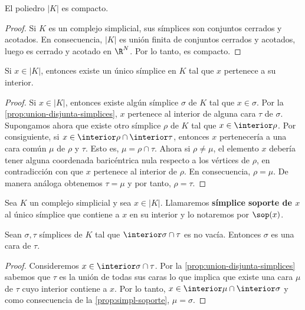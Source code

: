 \begin{proposicion}
	El poliedro \(|K|\) es compacto.
\end{proposicion}
\begin{proof}
	Si \(K\) es un complejo simplicial, sus símplices son conjuntos cerrados y
	acotados. En consecuencia, \(|K|\) es unión finita de conjuntos cerrados y
	acotados, luego es cerrado y acotado en \(\R^{N}\). Por lo tanto, es compacto.
\end{proof}
\begin{proposicion}
	\label{prop:simpl-soporte} Si \(x \in |K|\), entonces existe un único símplice
	en \(K\) tal que \(x\) pertenece a su interior.
\end{proposicion}
\begin{proof}
	Si \(x \in |K|\), entonces existe algún símplice \(\sigma\) de \(K\) tal que
	\(x \in \sigma\). Por la \autoref{prop:union-disjunta-simplices}, \(x\) pertenece
	al interior de alguna cara \(\tau\) de \(\sigma\). Supongamos ahora que existe otro
	símplice \(\rho\) de \(K\) tal que \(x \in \interior \rho\). Por consiguiente, si \(x
	\in \interior \rho \cap \interior \tau\), entonces \(x\) pertenecería a una cara
	común \(\mu\) de \(\rho\) y \(\tau\). Esto es, \(\mu = \rho \cap \tau\). Ahora si \(\rho
	\neq \mu\), el elemento \(x\) debería tener alguna coordenada baricéntrica nula
	respecto a los vértices de \(\rho\), en contradicción con que \(x\) pertenece al interior
	de \(\rho\). En consecuencia, \(\rho = \mu\). De manera análoga obtenemos
	\(\tau = \mu\) y por tanto, \(\rho = \tau\).
\end{proof}
\begin{definicion}
	Sea \(K\) un complejo simplicial y sea \(x \in |K|\). Llamaremos \textbf{símplice
	soporte de \(x\)} al único símplice que contiene a \(x\) en su interior y lo notaremos
	por \(\sop(x)\).
\end{definicion}
\begin{corolario}
	\label{cor:simpl-soporte} Sean \(\sigma, \tau\) símplices de \(K\) tal que \(\interior
	\sigma \cap \tau\) es no vacía. Entonces \(\sigma\) es una cara de \(\tau\).
\end{corolario}
\begin{proof}
	Consideremos \(x \in \interior \sigma \cap \tau\). Por la
	\autoref{prop:union-disjunta-simplices} sabemos que \(\tau\) es la unión de
	todas sus caras lo que implica que existe una cara \(\mu\) de \(\tau\) cuyo
	interior contiene a \(x\). Por lo tanto,
	\(x \in \interior \mu \cap \interior \sigma\) y como consecuencia de la
	\autoref{prop:simpl-soporte}, \(\mu = \sigma\).
\end{proof}
